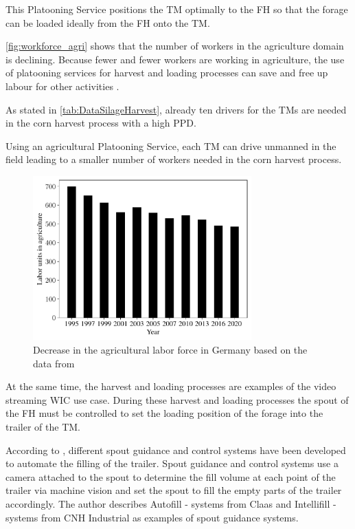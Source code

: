 This Platooning Service positions the \ac{TM} optimally to the \ac{FH} so that the forage can be loaded ideally from the \ac{FH} onto the \ac{TM}.


\autoref{fig:workforce_agri} shows that the number of workers in the agriculture domain is declining.  
Because fewer and fewer workers are working in agriculture, the use of platooning services for harvest and loading processes can save and free up labour for other activities \cite{liu_automation_2022}.

As stated in \autoref{tab:DataSilageHarvest}, already ten drivers for the \ac{TM}s are needed in the corn harvest process with a high \ac{PPD}. 

Using an agricultural Platooning Service, each \ac{TM} can drive unmanned in the field leading to a smaller number of workers needed in the corn harvest process.

\begin{figure}%
	\centering
	\includegraphics[width=0.75\textwidth]{figures/WorkForceAgriculture.pdf}
	\caption{Decrease in the agricultural labor force in Germany based on the data from \cite{bmel2020}}%
	\label{fig:workforce_agri}%
\end{figure}


At the same time, the harvest and loading processes are examples of the video streaming \ac{WIC} use case. During these harvest and loading processes the spout of the \ac{FH} must be controlled to set the loading position of the forage into the trailer of the \ac{TM}.

According to \textcite{murcia_quadrotor_2014}, different spout guidance and control systems have been developed to automate the filling of the trailer. Spout guidance and control systems use a camera attached to the spout to determine the fill volume at each point of the trailer via machine vision and set the spout to fill the empty parts of the trailer accordingly. The author describes Autofill - systems from Claas and Intellifill - systems from CNH Industrial as examples of spout guidance systems. 


